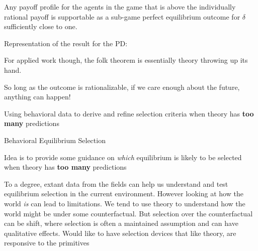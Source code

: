 \documentclass[english]{beamer}
\begin{document}
\begin{frame}
\begin{card}
    Any payoff profile for the agents in the game that is above the individually rational payoff is supportable as a sub-game perfect equilibrium outcome for $\delta$ sufficiently close to one.
\end{card}
\end{frame}


\begin{frame}
\begin{cardTiny}
Representation of the result for the PD:
\end{cardTiny}

\end{frame}

\begin{frame}
\begin{card}
    For applied work though, the folk theorem is essentially theory throwing up its hand.
    
    So long as the outcome is rationalizable, if we care enough about the future, anything can happen!
\end{card}\pause 

\begin{card}
    Using behavioral data to derive and refine selection criteria when theory has \textbf{too many} predictions
\end{card}
\end{frame}


\begin{frame}{Behavioral Equilibrium Selection}
\begin{card}
 Idea is to provide some guidance on \emph{which} equilibrium is likely to be selected when theory has \textbf{too many} predictions
 \end{card}    
\begin{card}
To a degree, extant data from the fields can help us understand and test equilibrium selection in the current environment.  However looking at how the world \emph{is} can lead to limitations. We tend to use theory to understand how the world might be under some counterfactual. But  selection over the counterfactual can be shift, where selection is often a maintained assumption and can have qualitative effects. Would like to have selection devices that like theory, are responsive to the primitives
 \end{card}
\end{frame}
\end{document}
